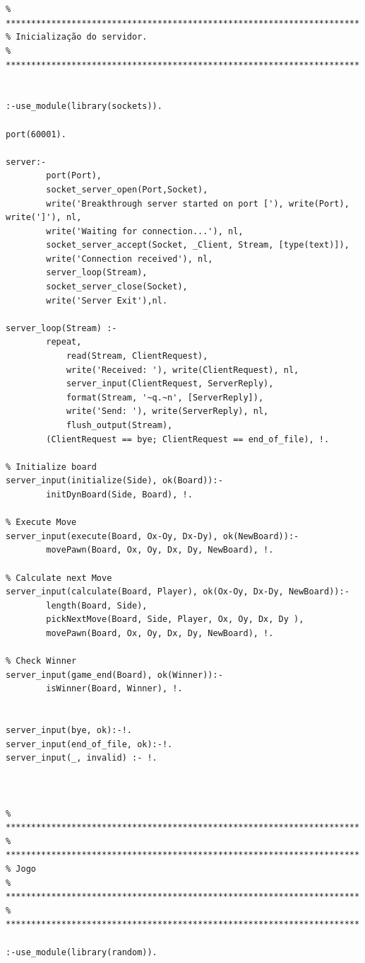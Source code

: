 \documentclass[15pt,a4paper]{article}
\begin{document}

\begin{lstlisting}


% **********************************************************************
% Inicialização do servidor.
% **********************************************************************


:-use_module(library(sockets)).

port(60001).

server:-
		port(Port),
		socket_server_open(Port,Socket),
		write('Breakthrough server started on port ['), write(Port), write(']'), nl,
		write('Waiting for connection...'), nl,
		socket_server_accept(Socket, _Client, Stream, [type(text)]),
		write('Connection received'), nl,
		server_loop(Stream),
		socket_server_close(Socket),
		write('Server Exit'),nl.

server_loop(Stream) :-
		repeat,
			read(Stream, ClientRequest),
			write('Received: '), write(ClientRequest), nl, 
			server_input(ClientRequest, ServerReply),
			format(Stream, '~q.~n', [ServerReply]),
			write('Send: '), write(ServerReply), nl, 
			flush_output(Stream),
		(ClientRequest == bye; ClientRequest == end_of_file), !.

% Initialize board
server_input(initialize(Side), ok(Board)):- 
		initDynBoard(Side, Board), !.

% Execute Move	
server_input(execute(Board, Ox-Oy, Dx-Dy), ok(NewBoard)):- 
		movePawn(Board, Ox, Oy, Dx, Dy, NewBoard), !.

% Calculate next Move
server_input(calculate(Board, Player), ok(Ox-Oy, Dx-Dy, NewBoard)):- 
		length(Board, Side),
		pickNextMove(Board, Side, Player, Ox, Oy, Dx, Dy ),
		movePawn(Board, Ox, Oy, Dx, Dy, NewBoard), !.
	
% Check Winner
server_input(game_end(Board), ok(Winner)):- 
		isWinner(Board, Winner), !.
	
	
server_input(bye, ok):-!.
server_input(end_of_file, ok):-!.
server_input(_, invalid) :- !.



% **********************************************************************
% **********************************************************************
% Jogo
% **********************************************************************
% **********************************************************************

:-use_module(library(random)).



\end{lstlisting}
\end{document}
